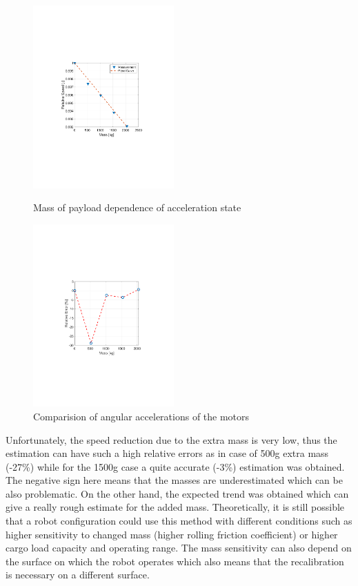 \documentclass[12pt,english,twoside]{article}
\begin{document}
\begin{figure}[htb!]
	\centering
	\includegraphics[height=7cm]{figures/rolling_fric_meas}
	\caption{Mass of payload dependence of acceleration state}
	\label{rolling_fric_meas}
	\endminipage\hfill
	\centering
	\includegraphics[height=7cm]{figures/mass_estimate}
	\caption{Comparision of angular accelerations of the motors}
	\label{mass_estimate}
	\endminipage\hfill
\end{figure}

Unfortunately, the speed reduction due to the extra mass is very low, thus the estimation can have such a high relative errors as in case of 500g extra mass (-27\%) while for the 1500g case a quite accurate (-3\%) estimation was obtained. The negative sign here means that the masses are underestimated which can be also problematic. On the other hand, the expected trend was obtained which can give a really rough estimate for the added mass. Theoretically, it is still possible that a robot configuration could use this method with different conditions such as higher sensitivity to changed mass (higher rolling friction coefficient) or higher cargo load capacity and operating range. The mass sensitivity can also depend on the surface on which the robot operates which also means that the recalibration is necessary on a different surface.
\end{document}
